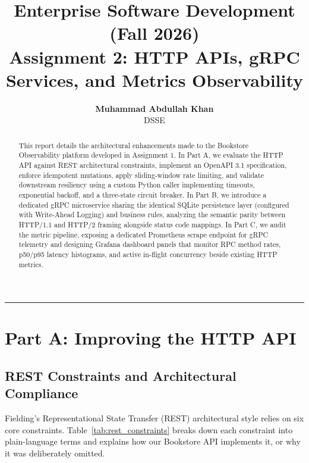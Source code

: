 \documentclass[11pt,a4paper]{article}
\title{\vspace{-1.5cm}\textbf{\Large Enterprise Software Development (Fall 2026)}\\[0.3em]
\textbf{\LARGE Assignment 2: HTTP APIs, gRPC Services, and Metrics Observability}}
\author{\textbf{Muhammad Abdullah Khan} \\ DSSE}
\date{}
\begin{document}
\maketitle

\begin{abstract}
This report details the architectural enhancements made to the Bookstore Observability platform developed in Assignment 1. In Part A, we evaluate the HTTP API against REST architectural constraints, implement an OpenAPI 3.1 specification, enforce idempotent mutations, apply sliding-window rate limiting, and validate downstream resiliency using a custom Python caller implementing timeouts, exponential backoff, and a three-state circuit breaker. In Part B, we introduce a dedicated gRPC microservice sharing the identical SQLite persistence layer (configured with Write-Ahead Logging) and business rules, analyzing the semantic parity between HTTP/1.1 and HTTP/2 framing alongside status code mappings. In Part C, we audit the metric pipeline, exposing a dedicated Prometheus scrape endpoint for gRPC telemetry and designing Grafana dashboard panels that monitor RPC method rates, p50/p95 latency histograms, and active in-flight concurrency beside existing HTTP metrics.
\end{abstract}

\vspace{-0.5em}
\hrule
\vspace{1em}

\section{Part A: Improving the HTTP API}

\subsection{REST Constraints and Architectural Compliance}
Fielding's Representational State Transfer (REST) architectural style relies on six core constraints. Table~\ref{tab:rest_constraints} breaks down each constraint into plain-language terms and explains how our Bookstore API implements it, or why it was deliberately omitted.
\end{document}
